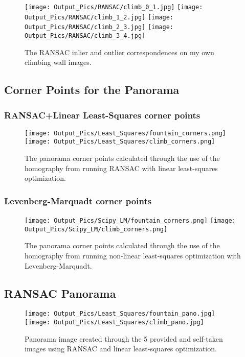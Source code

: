 \documentclass{article}
\begin{document}
\begin{figure}[H]
    \centering
    \texttt{[image: Output\_Pics/RANSAC/climb\_0\_1.jpg]}
    \texttt{[image: Output\_Pics/RANSAC/climb\_1\_2.jpg]}
    \texttt{[image: Output\_Pics/RANSAC/climb\_2\_3.jpg]}
    \texttt{[image: Output\_Pics/RANSAC/climb\_3\_4.jpg]}
    \caption{The RANSAC inlier and outlier correspondences on my own climbing wall images.}
\end{figure}

\subsection{Corner Points for the Panorama} \label{sec:corner-map}
\subsubsection{RANSAC+Linear Least-Squares corner points}
\begin{figure}[H]
    \centering
    \texttt{[image: Output\_Pics/Least\_Squares/fountain\_corners.png]}
    \texttt{[image: Output\_Pics/Least\_Squares/climb\_corners.png]}
    \caption{The panorama corner points calculated through the use of the homography from running RANSAC with linear least-squares optimization.}
\end{figure}

\subsubsection{Levenberg-Marquadt corner points}
\begin{figure}[H]
    \centering
    \texttt{[image: Output\_Pics/Scipy\_LM/fountain\_corners.png]}
    \texttt{[image: Output\_Pics/Scipy\_LM/climb\_corners.png]}
    \caption{The panorama corner points calculated through the use of the homography from running non-linear least-squares optimization with Levenberg-Marquadt.}
\end{figure}

\subsection{RANSAC Panorama}
\begin{figure}[H]
    \centering
    \texttt{[image: Output\_Pics/Least\_Squares/fountain\_pano.jpg]}
    \texttt{[image: Output\_Pics/Least\_Squares/climb\_pano.jpg]}
    \caption{Panorama image created through the 5 provided and self-taken images using RANSAC and linear least-squares optimization.}
\end{figure}
\end{document}
